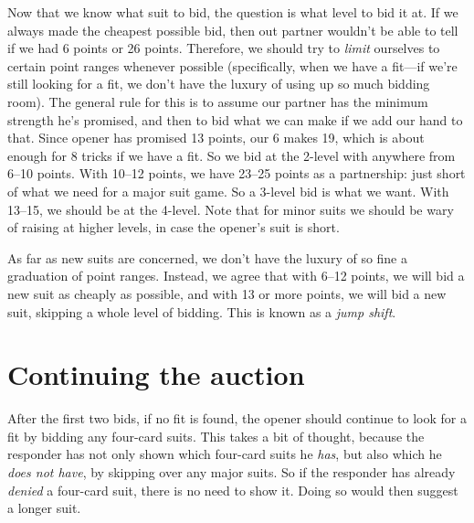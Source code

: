 \documentclass[oneside]{memoir}
\begin{document}
Now that we know what suit to bid, the question is what level to bid
it at.  If we always made the cheapest possible bid, then out partner
wouldn't be able to tell if we had 6 points or 26 points.  Therefore,
we should try to \textit{limit} ourselves to certain point ranges
whenever possible (specifically, when we have a fit---if we're still
looking for a fit, we don't have the luxury of using up so much
bidding room).  The general rule for this is to assume our partner has
the minimum strength he's promised, and then to bid what we can make
if we add our hand to that.  Since opener has promised 13 points, our
6 makes 19, which is about enough for 8 tricks if we have a fit.  So we
bid at the 2-level with anywhere from 6--10 points.  With 10--12 points,
we have 23--25 points as a partnership: just short of what we need for
a major suit game.  So a 3-level bid is what we want.  With 13--15, we
should be at the 4-level.  Note that for minor suits we should be wary
of raising at higher levels, in case the opener's suit is short.

As far as new suits are concerned, we don't have the luxury of so fine a
graduation of point ranges.  Instead, we agree that with 6--12 points, we
will bid a new suit as cheaply as possible, and with 13 or more points,
we will bid a new suit, skipping a whole level of bidding.  This is known
as a \textit{jump shift}.

\section{Continuing the auction}
After the first two bids, if no fit is found, the opener should continue
to look for a fit by bidding any four-card suits.  This takes a bit of
thought, because the responder has not only shown which four-card suits
he \textit{has}, but also which he \textit{does not have}, by skipping over
any major suits.  So if the responder has already \textit{denied} a four-card
suit, there is no need to show it.  Doing so would then suggest a longer suit.
\end{document}
